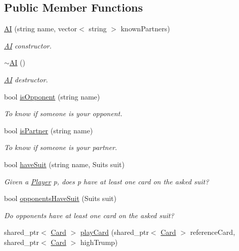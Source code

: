 \subsection*{\-Public \-Member \-Functions}
\begin{DoxyCompactItemize}
\item 
\hyperlink{classAI_a66d6cd98eca679d4f2e53d8e07d70231}{\-A\-I} (string name, vector$<$ string $>$ known\-Partners)
\begin{DoxyCompactList}\small\item\em \hyperlink{classAI}{\-A\-I} constructor. \end{DoxyCompactList}\item 
\hyperlink{classAI_a66a8645f0c27285cd75346f2c2bbfb14}{$\sim$\-A\-I} ()
\begin{DoxyCompactList}\small\item\em \hyperlink{classAI}{\-A\-I} destructor. \end{DoxyCompactList}\item 
bool \hyperlink{classAI_a4b7197635ffe4d2496b367c38c19cef4}{is\-Opponent} (string name)
\begin{DoxyCompactList}\small\item\em \-To know if someone is your opponent. \end{DoxyCompactList}\item 
bool \hyperlink{classAI_a6527528ecab508fa4bf99f80ee0efa50}{is\-Partner} (string name)
\begin{DoxyCompactList}\small\item\em \-To know if someone is your partner. \end{DoxyCompactList}\item 
bool \hyperlink{classAI_a6f39142d5c4b2dab8b053fcc0fbe9ab4}{have\-Suit} (string name, \-Suits suit)
\begin{DoxyCompactList}\small\item\em \-Given a \hyperlink{classPlayer}{\-Player} p, does p have at least one card on the asked suit? \end{DoxyCompactList}\item 
bool \hyperlink{classAI_a7203308d46eca68cc9b77b804857037d}{opponents\-Have\-Suit} (\-Suits suit)
\begin{DoxyCompactList}\small\item\em \-Do opponents have at least one card on the asked suit? \end{DoxyCompactList}\item 
shared\-\_\-ptr$<$ \hyperlink{classCard}{\-Card} $>$ \hyperlink{classAI_a3f5b2888e03634db701c66f82a4f03a8}{play\-Card} (shared\-\_\-ptr$<$ \hyperlink{classCard}{\-Card} $>$ reference\-Card, shared\-\_\-ptr$<$ \hyperlink{classCard}{\-Card} $>$ high\-Trump)

\end{DoxyCompactItemize}
